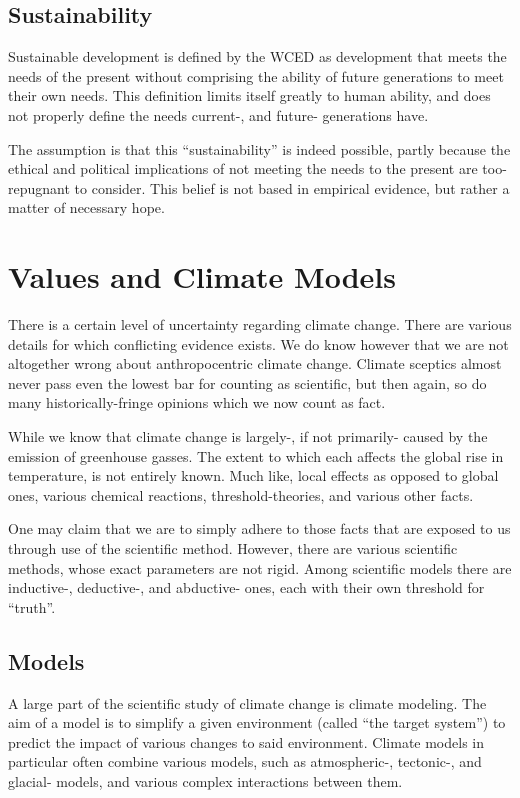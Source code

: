 \documentclass[12pt]{report}
\begin{document}
\section{Sustainability}

Sustainable development is defined by the WCED as development that meets the
needs of the present without comprising the ability of future generations to
meet their own needs. This definition limits itself greatly to human ability,
and does not properly define the needs current-, and future- generations have.

The assumption is that this ``sustainability'' is indeed possible, partly
because the ethical and political implications of not meeting the needs to the
present are too-repugnant to consider. This belief is not based in empirical
evidence, but rather a matter of necessary hope.

\chapter{Values and Climate Models}

There is a certain level of uncertainty regarding climate change. There are
various details for which conflicting evidence exists. We do know however that
we are not altogether wrong about anthropocentric climate change. Climate
sceptics almost never pass even the lowest bar for counting as scientific, but
then again, so do many historically-fringe opinions which we now count as fact.

While we know that climate change is largely-, if not primarily- caused by the
emission of greenhouse gasses. The extent to which each affects the global rise
in temperature, is not entirely known. Much like, local effects as opposed to
global ones, various chemical reactions, threshold-theories, and various other
facts.

One may claim that we are to simply adhere to those facts that are exposed to us
through use of the scientific method. However, there are various scientific
methods, whose exact parameters are not rigid. Among scientific models there are
inductive-, deductive-, and abductive- ones, each with their own threshold for
``truth''.

\section{Models}

A large part of the scientific study of climate change is climate modeling. The
aim of a model is to simplify a given environment (called ``the target system'')
to predict the impact of various changes to said environment. Climate models in
particular often combine various models, such as atmospheric-, tectonic-, and
glacial- models, and various complex interactions between them.
\end{document}
